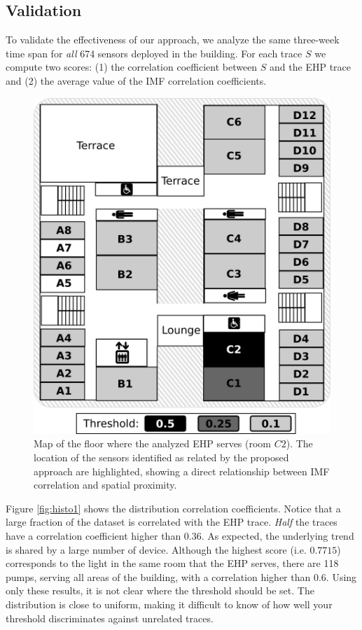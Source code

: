 \subsection{Validation}
To validate the effectiveness of our approach, we analyze the same three-week time span for \emph{all} 674 
sensors deployed in the building.
For each trace $S$ we compute two scores: (1) the correlation coefficient between $S$ and the EHP trace
and (2) the average value of the IMF correlation coefficients.


\begin{figure}
\centering
\includegraphics[width=.45\textwidth]{figs/floorMap.png}
\caption{Map of the floor where the analyzed EHP serves (room $C2$). The location of the sensors identified as related by the proposed approach are highlighted, showing a direct relationship between IMF correlation and spatial proximity.}
\label{fig:map}
\end{figure}

Figure \ref{fig:histo1} shows the distribution correlation coefficients.  Notice
that a large fraction of the dataset is correlated with the EHP trace.
\emph{Half} the traces have a correlation coefficient higher than $0.36$.  As expected, the underlying
trend is shared by a large number of device.
Although the highest score (i.e. $0.7715$) corresponds to the light in the same room that the EHP serves,
there are 118 pumps, serving all areas of the building, with a correlation higher than $0.6$.
Using only these results, it is not clear where the threshold should be set.  The distribution is close to 
uniform, making it difficult to 
know of how well your threshold discriminates against unrelated traces.

